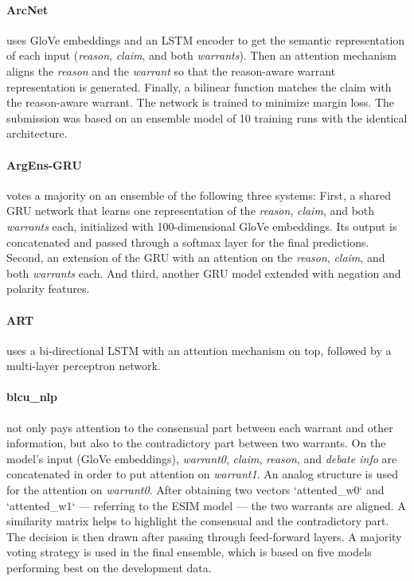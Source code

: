 \paragraph{ArcNet}
uses GloVe embeddings and an LSTM encoder to get the semantic representation of each input (\emph{reason}, \emph{claim}, and both \emph{warrants}). Then an attention mechanism aligns the \emph{reason} and the \emph{warrant} so that the reason-aware warrant representation is generated. Finally, a bilinear function matches the claim with the reason-aware warrant. The network is trained to minimize margin loss. The submission was based on an ensemble model of 10 training runs with the identical architecture.


\paragraph{ArgEns-GRU}
votes a majority on an ensemble of the following three systems: First, a shared GRU network that learns one representation of the \emph{reason}, \emph{claim}, and both \emph{warrants} each, initialized with 100-dimensional GloVe embeddings. Its output is concatenated and passed through a softmax layer for the final predictions. Second, an extension of the GRU with an attention on the \emph{reason}, \emph{claim}, and both \emph{warrants} each. And third, another GRU model extended with negation and polarity features.


\paragraph{ART}
uses a bi-directional LSTM with an attention mechanism on top, followed by a multi-layer perceptron network.


\paragraph{blcu\_nlp}
not only pays attention to the consensual part between each warrant and other information, but also to the contradictory part between two warrants. On the model's input (GloVe embeddings), \emph{warrant0}, \emph{claim}, \emph{reason}, and \emph{debate info} are concatenated in order to put attention on \emph{warrant1}. An analog structure is used for the attention on \emph{warrant0}. After obtaining two vectors `attented\_w0` and `attented\_w1` --- referring to the ESIM model \cite{Chen.et.al.2017.ACL.ESIM} --- the two warrants are aligned. A similarity matrix helps to highlight the consensual and the contradictory part. The decision is then drawn after passing through feed-forward layers. A majority voting strategy is used in the final ensemble, which is based on five models performing best on the development data.


